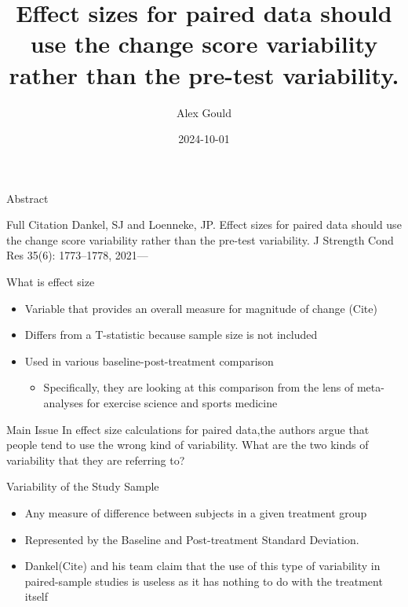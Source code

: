 \documentclass[
  ignorenonframetext,
  aspectratio=169,
]{beamer}
\title{Effect sizes for paired data should use the change score
variability rather than the pre-test variability.}
\author{Alex Gould}
\date{2024-10-01}
\providecommand{\tightlist}{%
  \setlength{\itemsep}{0pt}\setlength{\parskip}{0pt}}
\begin{document}
\frame{\titlepage}

\begin{frame}{Abstract}
\protect\hypertarget{abstract}{}
\begin{block}{Full Citation}
\protect\hypertarget{full-citation}{}
Dankel, SJ and Loenneke, JP. Effect sizes for paired data should use the
change score variability rather than the pre-test variability. J
Strength Cond Res 35(6): 1773--1778, 2021---
\end{block}

\begin{block}{What is effect size}
\protect\hypertarget{what-is-effect-size}{}
\begin{itemize}
\tightlist
\item
  Variable that provides an overall measure for magnitude of change
  (Cite)
\item
  Differs from a T-statistic because sample size is not included
\item
  Used in various baseline-post-treatment comparison

  \begin{itemize}
  \tightlist
  \item
    Specifically, they are looking at this comparison from the lens of
    meta-analyses for exercise science and sports medicine
  \end{itemize}
\end{itemize}
\end{block}
\end{frame}

\begin{frame}{Main Issue}
\protect\hypertarget{main-issue}{}
In effect size calculations for paired data,the authors argue that
people tend to use the wrong kind of variability. What are the two kinds
of variability that they are referring to?
\end{frame}

\begin{frame}{Variability of the Study Sample}
\protect\hypertarget{variability-of-the-study-sample}{}
\begin{itemize}
\tightlist
\item
  Any measure of difference between subjects in a given treatment group
\item
  Represented by the Baseline and Post-treatment Standard Deviation.
\item
  Dankel(Cite) and his team claim that the use of this type of
  variability in paired-sample studies is useless as it has nothing to
  do with the treatment itself
\end{itemize}
\end{frame}
\end{document}
